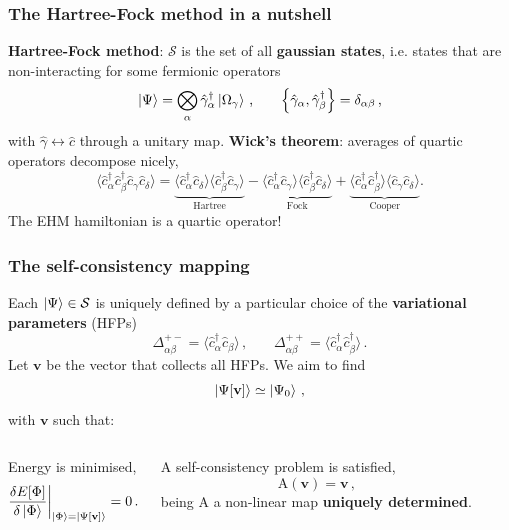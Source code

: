 \begin{frame}
	\frametitle{The Hartree-Fock method in a nutshell}
	
	\textbf{Hartree-Fock method}: $\mathcal{S}$ is the set of all \textbf{gaussian states}, i.e. states that are non-interacting for some fermionic operators 
	\[
	\ket{\Psi} = \bigotimes_\alpha \hat \gamma_\alpha^\dagger \ket{\Omega_\gamma} \, \text{,}
	\qquad
	\acomm{\hat \gamma_\alpha}{\hat \gamma_\beta^\dagger} = \delta_{\alpha\beta} \, \text{,}
	\]
	with $\hat \gamma \leftrightarrow \hat c$ through a unitary map.\medskip
	\DownImplication
	\textbf{Wick's theorem}: averages of quartic operators decompose nicely,
	\[
	\langle
	\hat c_\alpha^\dagger \hat c_\beta^\dagger \hat c_\gamma \hat c_\delta
	\rangle = \underbrace{
		\langle 
		\hat c_\alpha^\dagger \hat c_\delta
		\rangle \langle	
		\hat c_\beta^\dagger \hat c_\gamma 
		\rangle
	}_{\text{Hartree}}
	- 
	\underbrace{
		\langle 
		\hat c_\alpha^\dagger \hat c_\gamma
		\rangle \langle	
		\hat c_\beta^\dagger \hat c_\delta 
		\rangle 
	}_{\text{Fock}}
	+ 
	\underbrace{
		\langle 
		\hat c_\alpha^\dagger \hat c_\beta^\dagger
		\rangle \langle	
		\hat c_\gamma \hat c_\delta 
		\rangle 
	}_{\text{Cooper}} \text{.}
	\]
	The EHM hamiltonian is a quartic operator!
\end{frame}

\begin{frame}
	\frametitle{The self-consistency mapping}
	Each $\ket{\Psi}\in\mathcal{S}$ is uniquely defined by a particular choice of the \textbf{variational parameters} (HFPs)
	\[
	\Delta_{\alpha\beta}^{+-} = \langle 
	\hat c_\alpha^\dagger \hat c_\beta
	\rangle \, \text{,}
	\qquad
	\Delta_{\alpha\beta}^{++} = \langle 
	\hat c_\alpha^\dagger \hat c_\beta^\dagger
	\rangle \, \text{.}
	\]
	Let $\mathbf{v}$ be the vector that collects all HFPs. We aim to find
	\[
	\ket{\Psi[\mathbf{v}]} \simeq \ket{\Psi_0} \, \text{,}
	\]
	with $\mathbf{v}$ such that:
	
	\begin{columns}[t]
		\begin{tabbox}[frametitle=Variational picture]
			Energy is minimised,
			\[
			\fdv{E[\Phi]}{\ket{\Phi}} \bigg|_{\ket{\Phi} = \ket{\Psi[\mathbf{v}]}} = 0 \, \text{.}
			\]
		\end{tabbox}
		\begin{tabbox}[frametitle=Self-consistency picture]
			A self-consistency problem is satisfied,
			\[
			\mathrm{A}(\mathbf{v}) = \mathbf{v} \, \text{,}
			\]
			being $\mathrm{A}$ a non-linear map \textbf{uniquely determined}.
		\end{tabbox}
	\end{columns}
\end{frame}

